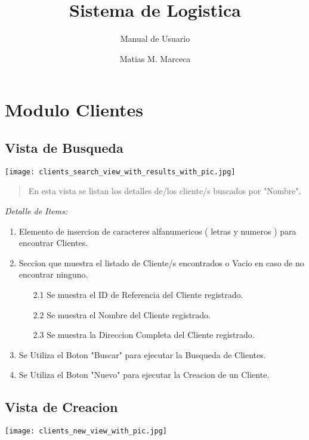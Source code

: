 \documentclass[
10pt, %
a4paper, %
oneside, %
headinclude,footinclude, %
BCOR5mm, %
]{scrartcl}
\title{Sistema de Logistica}
\subtitle{Manual de Usuario}
\author{Matias M. Marceca}
\date{}
\begin{document}
\maketitle
\tableofcontents
\pagebreak

\section{Modulo Clientes}
\subsection{Vista de Busqueda}

 \begin{flushleft}
     \texttt{[image: clients\_search\_view\_with\_results\_with\_pic.jpg]}
 \end{flushleft}

 \begin{quotation}
   En esta vista se listan los detalles de/los cliente/s buscados por \newline
   "Nombre".
 \end{quotation}

\pagebreak

 \emph{Detalle de Items:}
 \begin{enumerate}
   \item  Elemento de insercion de caracteres alfanumericos
     ( letras y numeros ) para encontrar Clientes.
   \item  Seccion que muestra el listado de Cliente/s encontrados
      o Vacio en caso de no encontrar ninguno.

   \begin{enumerate}
     \item[2.1] Se muestra el ID de Referencia del Cliente registrado.
     \item[2.2] Se muestra el Nombre del Cliente registrado.
     \item[2.3] Se muestra la Direccion Completa del Cliente registrado.
    \end{enumerate}

   \item Se Utiliza el Boton "Buscar" para ejecutar la Busqueda de Clientes.
   \item Se Utiliza el Boton "Nuevo" para ejecutar la Creacion de un Cliente.
  \end{enumerate}

\subsection{Vista de Creacion}
 \begin{flushleft}
     \texttt{[image: clients\_new\_view\_with\_pic.jpg]}
 \end{flushleft}
\end{document}
